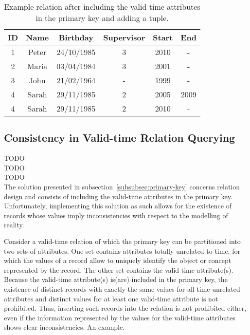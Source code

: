 


\begin{table}
\centering
\caption{Example relation after including the valid-time attributes in the primary key and adding a tuple.}
\begin{tabular}{c c c c c c }
\hline
\textbf{ID} & \textbf{Name} & \textbf{Birthday} & \textbf{Supervisor} & \textbf{Start} & \textbf{End} \\ \hline
1 & Peter & 24/10/1985 & 3 &  2010 & - \\
2 & Maria & 03/04/1984 & 3 & 2001 & - \\
3 & John & 21/02/1964 & - &  1999 & - \\
4 & Sarah & 29/11/1985 & 2 &  2005 & 2009 \\
4 & Sarah & 29/11/1985 & 2 &  2010 & - \\
\hline 
\end{tabular}
\label{table:example-database-with-new-pk}
\end{table}


\subsection{\label{subsubsec:consistency}Consistency in Valid-time Relation Querying}
TODO\\
TODO\\
TODO\\

The solution presented in subsection~\ref{subsubsec:primary-key} concerns relation design and consists of including the valid-time attributes in the primary key. Unfortunately, implementing this solution as such allows for the existence of records whose values imply inconsistencies with respect to the modelling of reality.

Consider a valid-time relation of which the primary key can be partitioned into two sets of attributes. One set contains attributes totally unrelated to time, for which the values of a record allow to uniquely identify the object or concept represented by the record. The other set contains the valid-time attribute(s). Because the valid-time attribute(s) is(are) included in the primary key, the existence of distinct records with exactly the same values for all time-unrelated attributes and distinct values for at least one valid-time attribute is not prohibited. Thus, inserting such records into the relation is not prohibited either, even if the information represented by the values for the valid-time attributes shows clear inconsistencies. An example.

